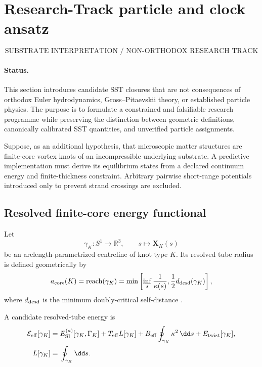 \section{Research-Track particle and clock ansatz}
\label{app:research-track}

\[
\boxed{
\text{SUBSTRATE INTERPRETATION / NON-ORTHODOX RESEARCH TRACK}
}
\]

\paragraph{Status.}
This section introduces candidate SST closures that are not consequences of
orthodox Euler hydrodynamics, Gross--Pitaevskii theory, or established particle
physics.  The purpose is to formulate a constrained and falsifiable research
programme while preserving the distinction between geometric definitions,
canonically calibrated SST quantities, and unverified particle assignments.

Suppose, as an additional hypothesis, that microscopic matter structures are
finite-core vortex knots of an incompressible underlying substrate.  A
predictive implementation must derive its equilibrium states from a declared
continuum energy and finite-thickness constraint.  Arbitrary pairwise
short-range potentials introduced only to prevent strand crossings are
excluded.

\subsection{Resolved finite-core energy functional}

Let
\begin{equation}
\gamma_K:
S^1\rightarrow\mathbb{R}^3,
\qquad
s\mapsto\bm{X}_K(s)
\end{equation}
be an arclength-parametrized centreline of knot type \(K\).  Its resolved tube
radius is defined geometrically by
\begin{equation}
a_{\rm core}(K)
=
\operatorname{reach}(\gamma_K)
=
\min\left[
\inf_s\frac{1}{\kappa(s)},
\frac{1}{2}d_{\rm dcsd}(\gamma_K)
\right],
\label{eq:RT-reach}
\end{equation}
where \(d_{\rm dcsd}\) is the minimum doubly-critical self-distance
\cite{CantarellaKusnerSullivan2002}.

A candidate resolved-tube energy is
\begin{align}
\mathcal{E}_{\rm eff}[\gamma_K]
={}&
E_{\rm SI}^{(a)}[\gamma_K,\Gamma_K]
+
T_{\rm eff}L[\gamma_K]
+
B_{\rm eff}\oint_{\gamma_K}\kappa^2\,\dd s
+
E_{\rm twist}[\gamma_K],
\label{eq:RT-resolved-functional}
\\
L[\gamma_K]
={}&
\oint_{\gamma_K}\dd s .
\end{align}

